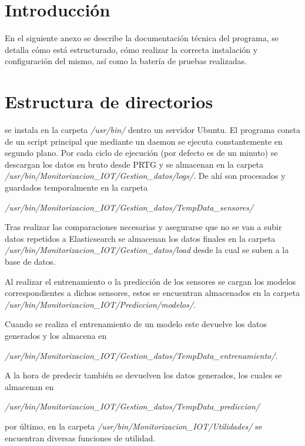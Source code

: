 

\section{Introducción}

En el siguiente anexo se describe la documentación técnica del programa, se detalla cómo está estructurado, cómo realizar la correcta instalación y configuración del mismo, así como la batería de pruebas realizadas.

\section{Estructura de directorios}

\nombrePrograma se instala en la carpeta \textit{/usr/bin/} dentro un servidor Ubuntu. El programa consta de un script principal que mediante un daemon se ejecuta constantemente en segundo plano. Por cada ciclo de ejecución (por defecto es de un minuto) se descargan los datos en bruto desde PRTG y se almacenan en la carpeta \textit{/usr/bin/Monitorizacion\_IOT/Gestion\_datos/logs/}. De ahí son procesados y guardados temporalmente en la carpeta

\textit{/usr/bin/Monitorizacion\_IOT/Gestion\_datos/TempData\_sensores/} 

Tras realizar las comparaciones necesarias y asegurarse que no se van a subir datos repetidos a Elasticsearch se almacenan los datos finales en la carpeta \textit{/usr/bin/Monitorizacion\_IOT/Gestion\_datos/load} desde la cual se suben a la base de datos.

Al realizar el entrenamiento o la predicción de los sensores se cargan los modelos correspondientes a dichos sensores, estos se encuentran almacenados en la carpeta \textit{/usr/bin/Monitorizacion\_IOT/Prediccion/modelos/}. 

Cuando se realiza el entrenamiento de un modelo este devuelve los datos generados y los almacena en

\textit{/usr/bin/Monitorizacion\_IOT/Gestion\_datos/TempData\_entrenamiento/}.

A la hora de predecir también se devuelven los datos generados, los cuales se almacenan en 

\textit{/usr/bin/Monitorizacion\_IOT/Gestion\_datos/TempData\_prediccion/}

por último, en la carpeta
\textit{/usr/bin/Monitorizacion\_IOT/Utilidades/} se encuentran diversas funciones de utilidad. 

